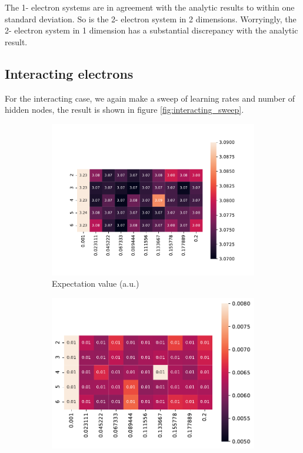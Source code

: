 \documentclass[11pt,a4paper,titlepage]{article}
\begin{document}
The 1- electron systems are in agreement with the analytic results to within one standard deviation. So is the 2- electron system in 2 dimensions. Worryingly, the 2- electron system in 1 dimension has a substantial discrepancy with the analytic result. 


\subsection{Interacting electrons}
For the interacting case, we again make a sweep of learning rates and number of hidden nodes, the result is shown in figure \ref{fig:interacting_sweep}.
\begin{figure}[H]
\begin{subfigure}{.5\textwidth}
\includegraphics[trim=2cm 0.9cm 2cm 0.9cm,scale = 0.6]{exp_valInteracting.pdf}
\caption{Expectation value (a.u.)}\label{expectInteract}
\end{subfigure}%
\begin{subfigure}{.5\textwidth}
\includegraphics[trim=0cm 0.3cm 0cm 0.0cm,scale = 0.6]{std_devInteracting.pdf}

\end{subfigure}
\end{figure}
\end{document}
